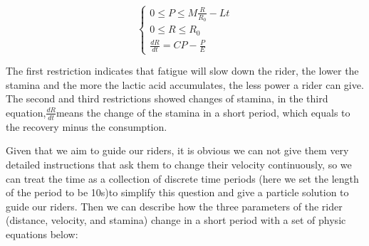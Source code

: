 \documentclass[12pt]{article}
\begin{document}
\begin{equation}
    \left\{
    \begin{array}{c}
        0                \leqslant  P  \leqslant  M\frac{R}{R_0}-Lt \\
        0                \leqslant  R  \leqslant  R_0               \\
        \frac{d R}{d t}=CP  -\frac{P}{E}%
    \end{array}
    \right.
\end{equation}

The first restriction indicates that fatigue will slow down the rider, the lower the stamina and the more the lactic acid accumulates, the less power a rider can give.
The second and third restrictions showed changes of stamina, in the third equation,$\frac{d R}{d t}$means the change of the stamina in a short period, which equals to the
recovery minus the consumption.

Given that we aim to guide our riders, it is obvious we can not give them very detailed instructions that ask them to change their velocity continuously, so we can treat the time
as a collection of discrete time periods (here we set the length of the period to be 10s)to simplify this question and give a particle solution to guide our riders.
Then we can describe how the three parameters of the rider (distance, velocity, and stamina) change in a short period with a set of physic equations below:
\end{document}

